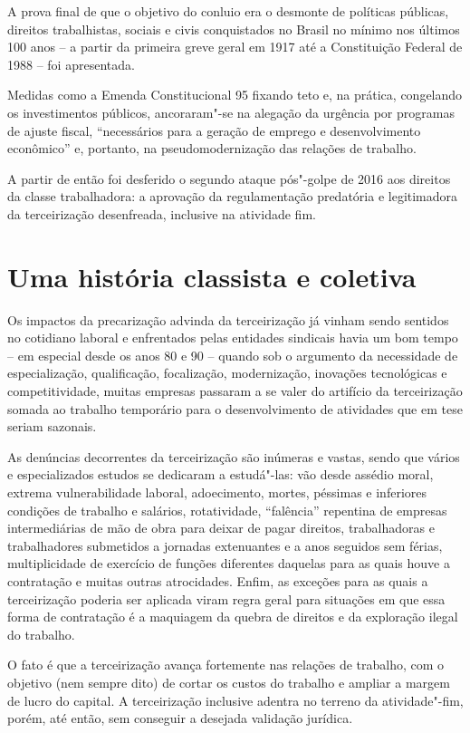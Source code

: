 A prova final de que o objetivo do conluio era o desmonte de políticas
públicas, direitos trabalhistas, sociais e civis conquistados no Brasil
no mínimo nos últimos 100 anos -- a partir da primeira greve geral em
1917 até a Constituição Federal de 1988 -- foi apresentada.

Medidas como a Emenda Constitucional 95 fixando teto e, na prática,
congelando os investimentos públicos, ancoraram"-se na alegação da
urgência por programas de ajuste fiscal, ``necessários para a geração de
emprego e desenvolvimento econômico'' e, portanto, na pseudomodernização
das relações de trabalho.

A partir de então foi desferido o segundo ataque pós"-golpe de 2016 aos
direitos da classe trabalhadora: a aprovação da regulamentação
predatória e legitimadora da terceirização desenfreada, inclusive na
atividade fim.

\section{Uma história classista e coletiva}

Os impactos da precarização advinda da terceirização já vinham sendo
sentidos no cotidiano laboral e enfrentados pelas entidades sindicais
havia um bom tempo -- em especial desde os anos 80 e 90 -- quando sob o
argumento da necessidade de especialização, qualificação, focalização,
modernização, inovações tecnológicas e competitividade, muitas empresas
passaram a se valer do artifício da terceirização somada ao trabalho
temporário para o desenvolvimento de atividades que em tese seriam
sazonais.

As denúncias decorrentes da terceirização são inúmeras e vastas, sendo
que vários e especializados estudos se dedicaram a estudá"-las: vão desde
assédio moral, extrema vulnerabilidade laboral, adoecimento, mortes,
péssimas e inferiores condições de trabalho e salários, rotatividade,
``falência'' repentina de empresas intermediárias de mão de obra para
deixar de pagar direitos, trabalhadoras e trabalhadores submetidos a
jornadas extenuantes e a anos seguidos sem férias, multiplicidade de
exercício de funções diferentes daquelas para as quais houve a
contratação e muitas outras atrocidades. Enfim, as exceções para as
quais a terceirização poderia ser aplicada viram regra geral para
situações em que essa forma de contratação é a maquiagem da quebra de
direitos e da exploração ilegal do trabalho.

O fato é que a terceirização avança fortemente nas relações de trabalho,
com o objetivo (nem sempre dito) de cortar os custos do trabalho e
ampliar a margem de lucro do capital. A terceirização inclusive adentra
no terreno da atividade"-fim, porém, até então, sem conseguir a desejada
validação jurídica.

